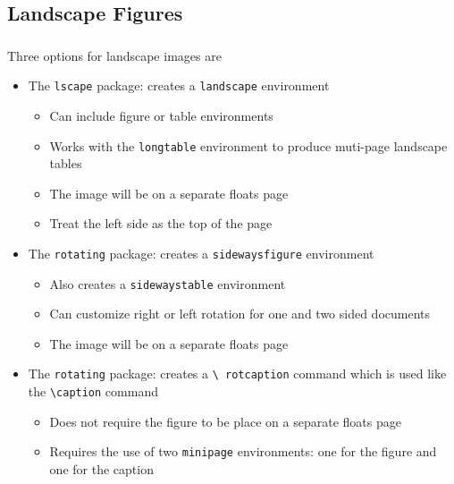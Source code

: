 \documentclass[article]{beamer}
\begin{document}
\subsection{Landscape Figures}
\begin{frame}[shrink]
  \frametitle{\thesubsection}
  \framesubtitle{}
  Three options for landscape images are
  \begin{itemize}%
    \item The \texttt{lscape} package: creates a \texttt{landscape}
      environment
      \begin{itemize}%
        \item Can include figure or table environments
        \item Works with the \texttt{longtable} environment to produce
          muti-page landscape tables
        \item The image will be on a separate floats page
        \item Treat the left side as the top of the page
      \end{itemize}
      
    \item The \texttt{rotating} package: creates a \texttt{sidewaysfigure}
      environment
      \begin{itemize}%
        \item Also creates a \texttt{sidewaystable} environment
        \item Can customize right or left rotation for one and two sided
          documents
        \item The image will be on a separate floats page
      \end{itemize}
      
    \item The \texttt{rotating} package: creates a \texttt{\textbackslash
      rotcaption} command which is used like the \texttt{\textbackslash caption}
      command
      \begin{itemize}%
        \item Does not require the figure to be place on a separate floats
          page
        \item Requires the use of two \texttt{minipage} environments: one for
          the figure and one for the caption
      \end{itemize}
      

  \end{itemize}
\end{frame}
\end{document}
